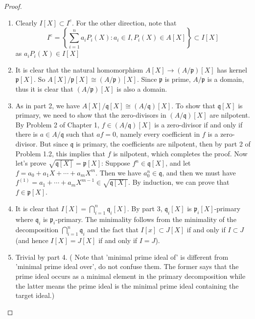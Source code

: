 \documentclass{solution}
\begin{document}
\begin{proof}
    \begin{enumerate}
        \item Clearly $I[X] \subset I^e$. For the other direction, note that
        $$I^e = \left\lbrace \sum\limits_{i = 1}^{n} a_i P_i(X): a_i \in I, P_i(X) \in A[X] \right\rbrace \subset I[X]$$
        as $a_i P_i(X) \in I[X]$
        \item It is clear that the natural homomorphism $A[X] \rightarrow (A / \mathfrak{p})[X]$ has kernel $\mathfrak{p}[X]$. So $A[X] / \mathfrak{p}[X] \cong (A / \mathfrak{p})[X]$. Since $\mathfrak{p}$ is prime, $A / \mathfrak{p}$ is a domain, thus it is clear that $(A / \mathfrak{p})[X]$ is also a domain.
        \item As in part 2, we have $A [X] / \mathfrak{q} [X] \cong (A / \mathfrak{q})[X]$. To show that $\mathfrak{q}[X]$ is primary, we need to show that the zero-divisors in $(A / \mathfrak{q})[X]$ are nilpotent. By Problem 2 of Chapter 1, $f \in (A / \mathfrak{q})[X]$ is a zero-divisor if and only if there is $a \in A / \mathfrak{q}$ such that $af = 0$, namely every coefficient in $f$ is a zero-divisor. But since $\mathfrak{q}$ is primary, the coefficients are nilpotent, then by part 2 of Problem 1.2, this implies that $f$ is nilpotent, which completes the proof. Now let's prove $\sqrt{\mathfrak{q}[X]} = \mathfrak{p}[X]$: Suppose $f^n \in \mathfrak{q}[X]$, and let $f = a_0 + a_1 X + \cdots + a_m X^m$. Then we have $a_0^n \in \mathfrak{q}$, and then we must have $f^{(1)} = a_1 + \cdots + a_m X^{m - 1} \in \sqrt{\mathfrak{q}[X]}$. By induction, we can prove that $f \in \mathfrak{p}[X]$.
        \item It is clear that $I[X] = \bigcap\limits_{i = 1}^{n} \mathfrak{q}_i[X]$. By part 3, $\mathfrak{q}_i[X]$ is $\mathfrak{p}_i[X]$-primary where $\mathfrak{q}_i$ is $\mathfrak{p}_i$-primary. The minimality follows from the minimality of the decomposition $\bigcap\limits_{i = 1}^{n} \mathfrak{q}_i$ and the fact that $I[x] \subset J[X]$ if and only if $I \subset J$ (and hence $I[X] = J[X]$ if and only if $I = J$).
        \item Trivial by part 4. ({\color{red} Note that 'minimal prime ideal of' is different from 'minimal prime ideal over', do not confuse them. The former says that the prime ideal occurs as a minimal element in the primary decomposition while the latter means the prime ideal is the minimal prime ideal containing the target ideal.})
    \end{enumerate}
\end{proof}
\end{document}
